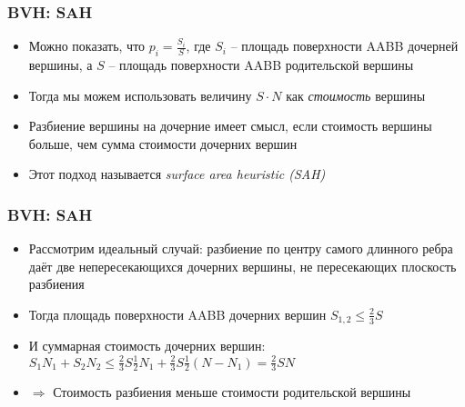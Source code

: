 \documentclass[10pt]{beamer}
\begin{document}
\begin{frame}[fragile]
\frametitle{BVH: SAH}
\begin{itemize}
\item Можно показать, что \begin{math}p_i = \frac{S_i}{S}\end{math}, где \begin{math}S_i\end{math} -- площадь поверхности AABB дочерней вершины, а \begin{math}S\end{math} -- площадь поверхности AABB родительской вершины
\pause
\item Тогда мы можем использовать величину \begin{math}S \cdot N\end{math} как \textit{стоимость} вершины
\pause
\item Разбиение вершины на дочерние имеет смысл, если стоимость вершины больше, чем сумма стоимости дочерних вершин
\pause
\item Этот подход называется \textit{surface area heuristic (SAH)}
\end{itemize}
\end{frame}

\begin{frame}[fragile]
\frametitle{BVH: SAH}
\begin{itemize}
\item Рассмотрим идеальный случай: разбиение по центру самого длинного ребра даёт две непересекающихся дочерних вершины, не пересекающих плоскость разбиения
\pause
\item Тогда площадь поверхности AABB дочерних вершин \begin{math}S_{1,2} \leq \frac{2}{3}S\end{math}
\pause
\item И суммарная стоимость дочерних вершин: \begin{math}S_1N_1+S_2N_2 \leq \frac{2}{3}S\frac{1}{2}N_1+\frac{2}{3}S\frac{1}{2}(N-N_1) = \frac{2}{3}SN\end{math}
\pause
\item \begin{math}\Longrightarrow\end{math} Стоимость разбиения меньше стоимости родительской вершины
\end{itemize}
\end{frame}
\end{document}
